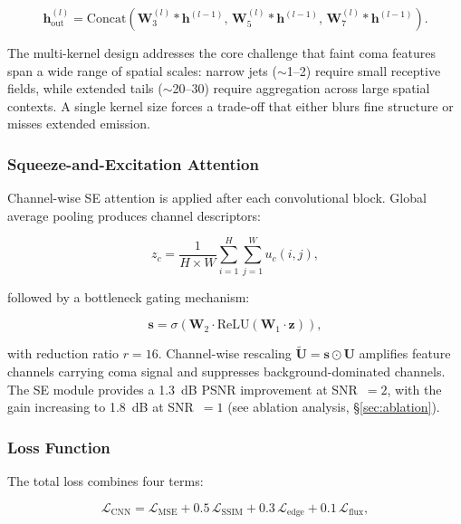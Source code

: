 \documentclass[usenatbib]{mnras}
\begin{document}
\begin{equation}\label{eq:multi_kernel}
\mathbf{h}_{\text{out}}^{(l)} = \text{Concat}\left(\mathbf{W}_3^{(l)} * \mathbf{h}^{(l-1)},\, \mathbf{W}_5^{(l)} * \mathbf{h}^{(l-1)},\, \mathbf{W}_7^{(l)} * \mathbf{h}^{(l-1)}\right).
\end{equation}

The multi-kernel design addresses the core challenge that faint coma features span a wide range of spatial scales: narrow jets ($\sim$1--2\arcsec) require small receptive fields, while extended tails ($\sim$20--30\arcsec) require aggregation across large spatial contexts. A single kernel size forces a trade-off that either blurs fine structure or misses extended emission.

\subsubsection{Squeeze-and-Excitation Attention}

Channel-wise SE attention \citep{hu18} is applied after each convolutional block. Global average pooling produces channel descriptors:

\begin{equation}\label{eq:se_squeeze}
z_c = \frac{1}{H \times W} \sum_{i=1}^{H} \sum_{j=1}^{W} u_c(i, j),
\end{equation}

followed by a bottleneck gating mechanism:

\begin{equation}\label{eq:se_excitation}
\mathbf{s} = \sigma\left(\mathbf{W}_2 \cdot \text{ReLU}\left(\mathbf{W}_1 \cdot \mathbf{z}\right)\right),
\end{equation}

with reduction ratio $r=16$. Channel-wise rescaling $\tilde{\mathbf{U}} = \mathbf{s} \odot \mathbf{U}$ amplifies feature channels carrying coma signal and suppresses background-dominated channels. The SE module provides a 1.3~dB PSNR improvement at SNR~$=2$, with the gain increasing to 1.8~dB at SNR~$=1$ (see ablation analysis, \S\ref{sec:ablation}).

\subsubsection{Loss Function}

The total loss combines four terms:

\begin{equation}\label{eq:total_loss}
\mathcal{L}_{\text{CNN}} = \mathcal{L}_{\text{MSE}} + 0.5\,\mathcal{L}_{\text{SSIM}} + 0.3\,\mathcal{L}_{\text{edge}} + 0.1\,\mathcal{L}_{\text{flux}},
\end{equation}
\end{document}
